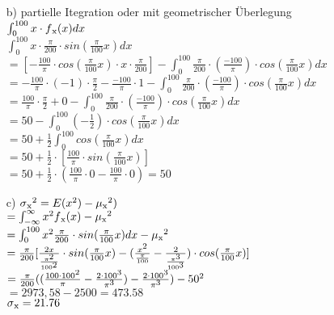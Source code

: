 \documentclass[a4paper]{article}
\begin{document}
\begin{description}
\begin{itemize}
			\item[b)] partielle Itegration oder mit geometrischer Überlegung\\
			
								$\int_0^{100} x\cdot f\textsubscript{x}(x)dx$\\
								$\int_0^{100} x \cdot \frac{\pi}{200}\cdot sin(\frac{\pi}{100}x)dx$\\
								$=[-\frac{100}{\pi}\cdot cos(\frac{\pi}{100}x)\cdot x \cdot\frac{\pi}{200}] - \int_0^{100} \frac{\pi}{200} \cdot (\frac{-100}{\pi})\cdot cos(\frac{\pi}{100}x)dx$\\
								$=-\frac{100}{\pi}\cdot (-1) \cdot \frac{\pi}{2} - \frac{-100}{\pi} \cdot 1 - \int_0^{100} \frac{\pi}{200} \cdot (\frac{-100}{\pi})\cdot cos(\frac{\pi}{100}x)dx$\\
								$=\frac{100}{\pi}\cdot \frac{\pi}{2} + 0 - \int_0^{100} \frac{\pi}{200} \cdot (\frac{-100}{\pi})\cdot cos(\frac{\pi}{100}x)dx$\\
								$=50- \int_0^{100} (-\frac{1}{2}) \cdot cos(\frac{\pi}{100}x)dx$\\
								$=50+\frac{1}{2} \int_0^{100} cos(\frac{\pi}{100}x)dx$\\
								$=50+\frac{1}{2}\cdot [\frac{100}{\pi} \cdot sin(\frac{\pi}{100}x)] $\\
								$=50+\frac{1}{2}\cdot (\frac{100}{\pi}\cdot 0 - \frac{100}{\pi}\cdot 0) = 50$\\
								
			\item[c)] $\sigma \textsubscript{x}\textsuperscript{2} = E(x\textsuperscript{2})-\mu\textsubscript{x} \textsuperscript{2})$\\
								$=\int_{-\infty}^{\infty} x\textsuperscript{2} f\textsubscript{x}(x) - \mu\textsubscript{x} \textsuperscript{2}$\\
								$=\int_0^{100} x\textsuperscript{2} \frac{\pi}{200}\cdot sin(\frac{\pi}{100}x)dx -\mu\textsubscript{x} \textsuperscript{2}$\\
								$=\frac{\pi}{200} [\frac{2x}{\frac{\pi\textsuperscript{2}}{100\textsuperscript{2}}} \cdot sin(\frac{\pi}{100}x) - (\frac{x\textsuperscript{2}}{\frac{\pi}{100}} - \frac{2}{\frac{\pi\textsuperscript{3}}{100\textsuperscript{3}}})\cdot cos(\frac{\pi}{100}x)]$\\
								$=\frac{\pi}{200} ((\frac{100\cdot 100\textsuperscript{2}}{\pi}-\frac{2\cdot 100\textsuperscript{3}}{\pi\textsuperscript{3}})- \frac{2\cdot 100\textsuperscript{3}}{\pi\textsuperscript{3}}) - 50\textsuperscript{2}$\\
								$=2973,58 - 2500 = 473.58$\\
								$\sigma\textsubscript{x}= 21.76$\\
		\end{itemize}


\end{description}
\end{document}
